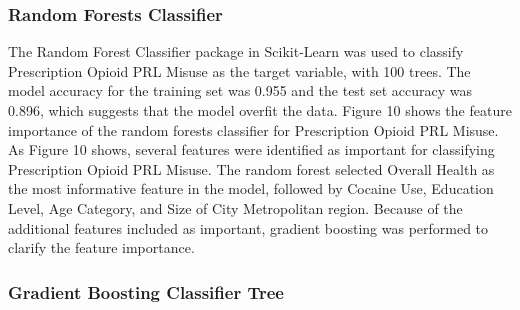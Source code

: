 \documentclass[sigconf]{acmart}
\begin{document}
\subsubsection{Random Forests Classifier}

The Random Forest Classifier package in Scikit-Learn was used to classify
Prescription Opioid PRL Misuse as the target variable, with 100 trees. The 
model accuracy for the training set was 0.955 and the test set accuracy was 
0.896, which suggests that the model overfit the data. Figure 10 shows the 
feature importance of the random forests classifier for Prescription Opioid 
PRL Misuse. As Figure 10 shows, several features were identified as important
for classifying Prescription Opioid PRL Misuse. The random forest selected 
Overall Health as the most informative feature in the model, followed by 
Cocaine Use, Education Level, Age Category, and Size of City Metropolitan 
region. Because of the additional features included as important, gradient 
boosting was performed to clarify the feature importance.
\subsubsection{Gradient Boosting Classifier Tree}
\end{document}
